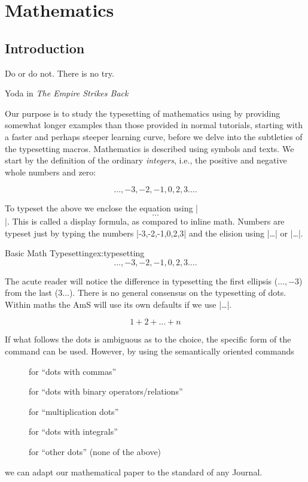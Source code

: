 \chapter{Mathematics}

\section{Introduction}
\epigraph{Do or do not. There is no try.}{Yoda in \textit{The Empire Strikes Back}}

Our purpose is to study the typesetting of mathematics using \latexe by providing somewhat longer examples than those provided in normal \latex tutorials, starting with a faster and perhaps steeper learning curve, before we delve into the subtleties of the typesetting macros. Mathematics is described using symbols and texts. We start by the definition of the ordinary \textit{integers}, i.e., the positive and negative whole numbers and zero:

\[\ldots,-3,-2,-1,0,2,3\dots.\]

To typeset the above we enclose the equation using |\[ ... \]|. This is called a display formula, as compared to inline math. Numbers are typeset just by typing the numbers |-3,-2,-1,0,2,3| and the elision using |\ldots | or |\dots|. 

\begin{texexample}{Basic Math Typesetting}{ex:typesetting}
\[\ldots,-3,-2,-1,0,2,3\dots.\]
\end{texexample}


The acute reader will notice the difference in typesetting the first ellipsis ($\ldots, -3$) from the last ($3\dots$). There is no general consensus on the typesetting of dots. Within maths the AmS will use its own defaults if we use |\dots|. 

\[ 1 + 2 +\dots + n  \]

If what follows the dots is ambiguous as to the
choice, the specific form of the command can be used. However, by using the semantically
oriented commands
\begin{description}
 \item[] for \enquote{dots with commas}
 \item[] for \enquote{dots with binary operators/relations}
 \item[] for \enquote{multiplication dots}
 \item[] for \enquote{dots with integrals}
 \item[] for \enquote{other dots} (none of the above)
\end{description}
we can adapt our mathematical paper to the standard of any Journal.

